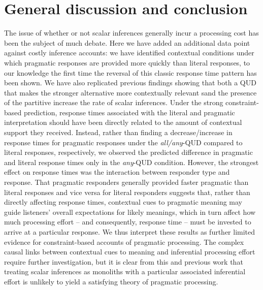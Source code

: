 \documentclass[10pt,letterpaper]{article}
\begin{document}


\section{General discussion and conclusion}

The issue of whether or not scalar inferences generally incur a processing cost has been the subject of much debate. Here we have added an additional data point against costly inference accounts: we have identified contextual conditions under which pragmatic responses are provided more quickly than literal responses, to our knowledge the first time the reversal of this classic response time pattern has been shown. We have also replicated previous findings showing that both a QUD that makes the stronger alternative more contextually relevant sand the presence of the partitive increase the rate of scalar inferences. Under the strong constraint-based prediction, response times associated with the literal and pragmatic interpretation should have been directly related to the amount of contextual support they received. Instead, rather than finding a decrease/increase in response times for pragmatic responses under the \emph{all/any}-QUD compared to literal responses, respectively, we observed the predicted difference in pragmatic and literal response times only in the \emph{any}-QUD condition. However, the strongest effect on response times was the interaction between responder type and response. That pragmatic responders generally provided faster pragmatic than literal responses and vice versa for literal responders suggests that, rather than directly affecting response times, contextual cues to pragmatic meaning may guide listeners' overall expectations for likely meanings, which in turn affect how much processing effort -- and consequently, response time -- must be invested to arrive at a particular response. We thus interpret these results as further limited evidence for constraint-based accounts of pragmatic processing. The complex causal links between contextual cues to meaning and inferential processing effort require further investigation, but it is clear from this and previous work that treating scalar inferences as monoliths with a particular associated inferential effort is unlikely to yield a satisfying theory of pragmatic processing.
\end{document}

